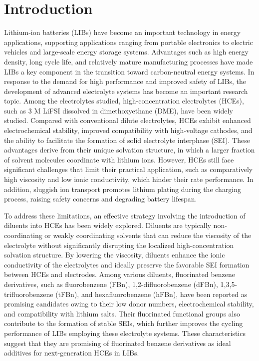 \documentclass[11pt, a4paper]{article}
\begin{document}

\clearpage

\section{Introduction}

{Lithium-ion batteries (LIBs) have become an important technology in energy applications, supporting applications ranging from portable electronics to electric vehicles and large-scale energy storage systems\cite{ref.1}. Advantages such as high energy density, long cycle life, and relatively mature manufacturing processes have made LIBs a key component in the transition toward carbon-neutral energy systems. In response to the demand for high performance and improved safety of LIBs, the development of advanced electrolyte systems has become an important research topic\cite{ref.2}. Among the electrolytes studied, high-concentration electrolytes (HCEs), such as 3 M LiFSI dissolved in dimethoxyethane (DME)\cite{ref.3}, have been widely studied. Compared with conventional dilute electrolytes, HCEs exhibit enhanced electrochemical stability, improved compatibility with high-voltage cathodes, and the ability to facilitate the formation of solid electrolyte interphase (SEI)\cite{ref.4}. These advantages derive from their unique solvation structure, in which a larger fraction of solvent molecules coordinate with lithium ions\cite{ref.5}. However, HCEs still face significant challenges that limit their practical application, such as comparatively high viscosity\cite{ref.6} and low ionic conductivity\cite{ref.7}, which hinder their rate performance. In addition, sluggish ion transport promotes lithium plating during the charging process, raising safety concerns and degrading battery lifespan\cite{ref.7}.

To address these limitations, an effective strategy involving the introduction of diluents into HCEs has been widely explored. Diluents are typically non-coordinating or weakly coordinating solvents that can reduce the viscosity of the electrolyte without significantly disrupting the localized high-concentration solvation structure\cite{ref.8}. By lowering the viscosity, diluents enhance the ionic conductivity of the electrolytes and ideally preserve the favorable SEI formation between HCEs and electrodes\cite{ref.8}. Among various diluents, fluorinated benzene derivatives, such as fluorobenzene (FBn)\cite{ref.8}, 1,2-difluorobenzene (dFBn)\cite{ref.9}, 1,3,5-trifluorobenzene (tFBn)\cite{ref.10}, and hexafluorobenzene (hFBn)\cite{ref.11}, have been reported as promising candidates owing to their low donor numbers, electrochemical stability, and compatibility with lithium salts. Their fluorinated functional groups also contribute to the formation of stable SEIs, which further improves the cycling performance of LIBs employing these electrolyte systems\cite{ref.10}. These characteristics suggest that they are promising of fluorinated benzene derivatives as ideal additives for next-generation HCEs in LIBs.

}
\end{document}
